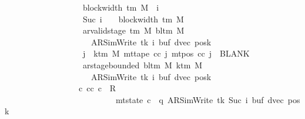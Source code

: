 \begin{isabellebody}
\ \ \ \ \ \ \ \ \ \ \ \ \ \ \ \ \ \ \ block{\isacharunderscore}{\kern0pt}width\ {\isacharparenleft}{\kern0pt}{\isasymGamma}{\isacharunderscore}{\kern0pt}tm\ M{\isacharparenright}{\kern0pt}\ {\isasymle}\ i{\isacharsemicolon}{\kern0pt}\isanewline
\ \ \ \ \ \ \ \ \ \ \ \ \ \ \ \ \ \ \ Suc\ i\ {\isacharless}{\kern0pt}\ {}\ {\isacharasterisk}{\kern0pt}\ block{\isacharunderscore}{\kern0pt}width\ {\isacharparenleft}{\kern0pt}{\isasymGamma}{\isacharunderscore}{\kern0pt}tm\ M{\isacharparenright}{\kern0pt}{\isacharsemicolon}{\kern0pt}\isanewline
\ \ \ \ \ \ \ \ \ \ \ \ \ \ \ \ \ \ \ ar{\isacharunderscore}{\kern0pt}valid{\isacharunderscore}{\kern0pt}stage\ {\isacharparenleft}{\kern0pt}{\isasymGamma}{\isacharunderscore}{\kern0pt}tm\ M{\isacharparenright}{\kern0pt}\ {\isacharparenleft}{\kern0pt}bl{\isacharunderscore}{\kern0pt}tm\ M{\isacharparenright}{\kern0pt}\isanewline
\ \ \ \ \ \ \ \ \ \ \ \ \ \ \ \ \ \ \ \ \ {\isacharparenleft}{\kern0pt}AR{\isacharunderscore}{\kern0pt}SimWrite{\isacharcomma}{\kern0pt}\ tk{\isacharcomma}{\kern0pt}\ i{\isacharcomma}{\kern0pt}\ buf{\isacharcomma}{\kern0pt}\ dvec{\isacharcomma}{\kern0pt}\ posk{\isacharparenright}{\kern0pt}{\isacharsemicolon}{\kern0pt}\isanewline
\ \ \ \ \ \ \ \ \ \ \ \ \ \ \ \ \ \ \ {\isasymforall}j\ {\isasymge}\ k{\isacharunderscore}{\kern0pt}tm\ M{\isachardot}{\kern0pt}\ mt{\isacharunderscore}{\kern0pt}tape\ cc\ j\ {\isacharparenleft}{\kern0pt}mt{\isacharunderscore}{\kern0pt}pos\ cc\ j{\isacharparenright}{\kern0pt}\ {\isacharequal}{\kern0pt}\ BLANK{}{\isacharsemicolon}{\kern0pt}\isanewline
\ \ \ \ \ \ \ \ \ \ \ \ \ \ \ \ \ \ \ ar{\isacharunderscore}{\kern0pt}stage{\isacharunderscore}{\kern0pt}bounded\ {\isacharparenleft}{\kern0pt}bl{\isacharunderscore}{\kern0pt}tm\ M{\isacharparenright}{\kern0pt}\ {\isacharparenleft}{\kern0pt}k{\isacharunderscore}{\kern0pt}tm\ M{\isacharparenright}{\kern0pt}\isanewline
\ \ \ \ \ \ \ \ \ \ \ \ \ \ \ \ \ \ \ \ \ {\isacharparenleft}{\kern0pt}AR{\isacharunderscore}{\kern0pt}SimWrite{\isacharcomma}{\kern0pt}\ tk{\isacharcomma}{\kern0pt}\ i{\isacharcomma}{\kern0pt}\ buf{\isacharcomma}{\kern0pt}\ dvec{\isacharcomma}{\kern0pt}\ posk{\isacharparenright}{\kern0pt}\ {\isasymrbrakk}\isanewline
\ \ \ \ \ \ \ \ \ \ \ \ \ \ \ \ \ {\isasymLongrightarrow}\ {\isasymexists}c{\isacharprime}{\kern0pt}{\isacharprime}{\kern0pt}{\isachardot}{\kern0pt}\ {\isacharparenleft}{\kern0pt}cc{\isacharcomma}{\kern0pt}\ c{\isacharprime}{\kern0pt}{\isacharprime}{\kern0pt}{\isacharparenright}{\kern0pt}\ {\isasymin}\ R{\isacharprime}{\kern0pt}\isanewline
\ \ \ \ \ \ \ \ \ \ \ \ \ \ \ \ \ \ \ \ \ \ \ \ \ \ {\isasymand}\ mt{\isacharunderscore}{\kern0pt}state\ c{\isacharprime}{\kern0pt}{\isacharprime}{\kern0pt}\ {\isacharequal}{\kern0pt}\ {\isacharparenleft}{\kern0pt}q{\isacharcomma}{\kern0pt}\ AR{\isacharunderscore}{\kern0pt}SimWrite{\isacharcomma}{\kern0pt}\ tk{\isacharcomma}{\kern0pt}\ Suc\ i{\isacharcomma}{\kern0pt}\ buf{\isacharcomma}{\kern0pt}\ dvec{\isacharcomma}{\kern0pt}\ posk{\isacharparenright}{\kern0pt}\isanewline

\end{isabellebody}
